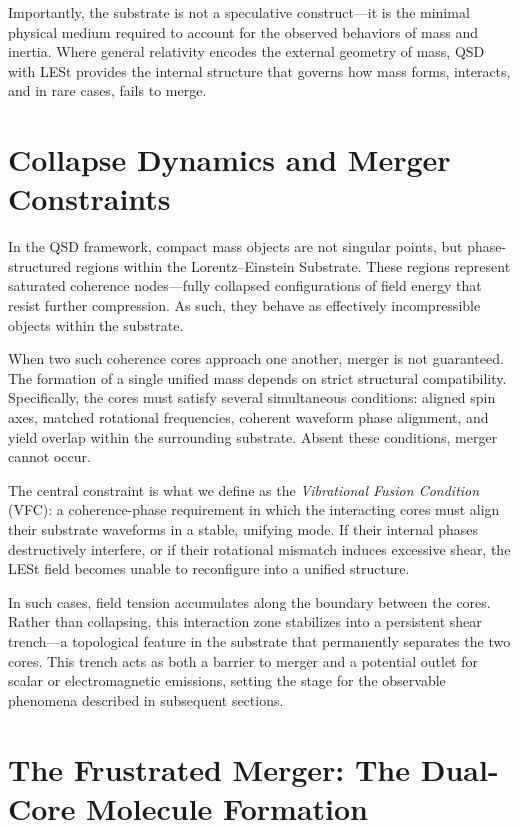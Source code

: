 \documentclass[sn-mathphys]{sn-jnl}
\theoremstyle{thmstyleone}%
\theoremstyle{thmstyletwo}%
\theoremstyle{thmstylethree}%
\begin{document}
Importantly, the substrate is not a speculative construct—it is the minimal physical medium required to account for the observed behaviors of mass and inertia. Where general relativity encodes the external geometry of mass, QSD with LESt provides the internal structure that governs how mass forms, interacts, and in rare cases, fails to merge.


\section{Collapse Dynamics and Merger Constraints}
In the QSD framework, compact mass objects are not singular points, but phase-structured regions within the Lorentz--Einstein Substrate. These regions represent saturated coherence nodes—fully collapsed configurations of field energy that resist further compression. As such, they behave as effectively incompressible objects within the substrate.

When two such coherence cores approach one another, merger is not guaranteed. The formation of a single unified mass depends on strict structural compatibility. Specifically, the cores must satisfy several simultaneous conditions: aligned spin axes, matched rotational frequencies, coherent waveform phase alignment, and yield overlap within the surrounding substrate. Absent these conditions, merger cannot occur.


The central constraint is what we define as the \textit{Vibrational Fusion Condition} (VFC): a coherence-phase requirement in which the interacting cores must align their substrate waveforms in a stable, unifying mode. If their internal phases destructively interfere, or if their rotational mismatch induces excessive shear, the LESt field becomes unable to reconfigure into a unified structure.

In such cases, field tension accumulates along the boundary between the cores. Rather than collapsing, this interaction zone stabilizes into a persistent shear trench—a topological feature in the substrate that permanently separates the two cores. This trench acts as both a barrier to merger and a potential outlet for scalar or electromagnetic emissions, setting the stage for the observable phenomena described in subsequent sections.


\section{The Frustrated Merger: The Dual-Core Molecule Formation}
\end{document}
